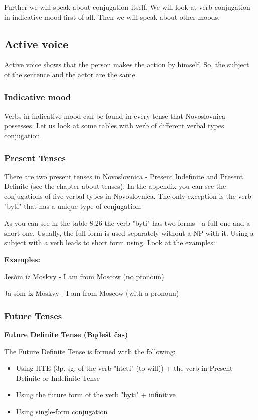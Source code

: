 Further we will speak about conjugation itself. We will look at verb conjugation in indicative mood first of all. Then we will speak about other moods.

\subsection{Active voice}

Active voice shows that the person makes the action by himself. So, the subject of the sentence and the actor are the same.

\subsubsection{Indicative mood}

Verbs in indicative mood can be found in every tense that Novoslovnica possesses. Let us look at some tables with verb of different verbal types conjugation.

\subsubsection{Present Tenses}

There are two present tenses in Novoslovnica - Present Indefinite and Present Definite (see the chapter about tenses). In the appendix you can see the conjugations of five verbal types in Novoslovnica. The only exception is the verb "byti" that has a unique type of conjugation.

As you can see in the table 8.26 the verb "byti" has two forms - a full one and a short one. Usually, the full form is used separately without a NP with it. Using a subject with a verb leads to short form using. Look at the examples:

\textbf{Examples:}

Jesòm iz Moskvy - I am from Moscow (no pronoun)

Ja sòm iz Moskvy - I am from Moscow (with a pronoun) 

\subsubsection{Future Tenses}

\textbf{Future Definite Tense (Bųdešt čas)}

The Future Definite Tense is formed with the following:

\begin{itemize}
	\item Using HTE (3p. sg. of the verb "hteti" (to will)) + the verb in Present Definite or Indefinite Tense
	\item Using the future form of the verb "byti" + infinitive
	\item Using single-form conjugation 
\end{itemize}

